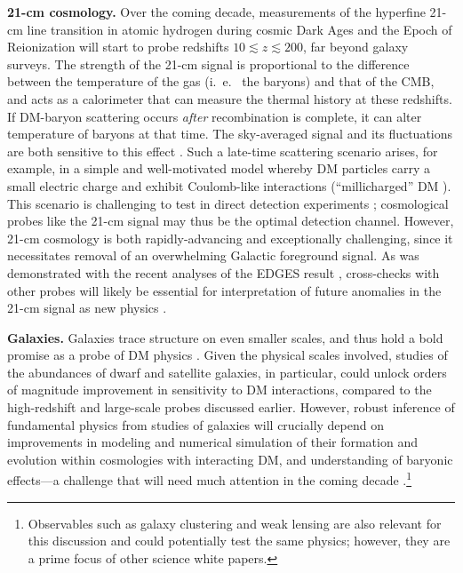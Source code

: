 \documentclass[12pt]{article}
\begin{document}
\textbf{21-cm cosmology.} 
Over the coming decade, measurements of the hyperfine 21-cm line transition in atomic hydrogen during cosmic Dark Ages and the Epoch of Reionization will start to probe redshifts $10 \lesssim z \lesssim 200$, far beyond galaxy surveys.
The strength of the 21-cm signal is proportional to the difference between the temperature of the gas (i.~e.~ the baryons) and that of the CMB, and acts as a calorimeter that can measure the thermal history at these redshifts.
If DM-baryon scattering occurs \textit{after} recombination is complete, it can alter temperature of baryons at that time. 
The sky-averaged signal and its fluctuations are both sensitive to this effect \cite{Munoz_15, Barkana_18, Fialkov_18, Munoz_18,2018arXiv180210094M}.
Such a late-time scattering scenario arises, for example, in a simple and well-motivated model whereby DM particles carry a small electric charge and exhibit Coulomb-like interactions (``millicharged'' DM \cite{2017arXiv170704591B,2019arXiv190208623D}).
This scenario is challenging to test in direct detection experiments \cite{2011PhRvD..83f3509M}; cosmological probes like the 21-cm signal may thus be the optimal detection channel.
However, 21-cm cosmology is both rapidly-advancing and exceptionally challenging, since it necessitates removal of an overwhelming Galactic foreground signal. 
As was demonstrated with the recent analyses of the EDGES result \cite{Bowman_18}, cross-checks with other probes will likely be essential for interpretation of future anomalies in the 21-cm signal as new physics \cite{Barkana:2018lgd,Kovetz:2018zan,Berlin:2018sjs}. 

\textbf{Galaxies.}
Galaxies trace structure on even smaller scales, and thus hold a bold promise as a probe of DM physics \cite{2019arXiv190201055D}.
Given the physical scales involved, studies of the abundances of dwarf and satellite galaxies, in particular, could unlock orders of magnitude improvement in sensitivity to DM interactions, compared to the high-redshift and large-scale probes discussed earlier.
However, robust inference of fundamental physics from studies of galaxies will crucially depend on improvements in modeling and numerical simulation of their formation and evolution within cosmologies with interacting DM, and understanding of baryonic effects---a challenge that will need much attention in the coming decade \cite{2019arXiv190201055D}.\footnote{Observables such as galaxy clustering and weak lensing are also relevant for this discussion and could potentially test the same physics; however, they are a prime focus of other science white papers.}
\end{document}
